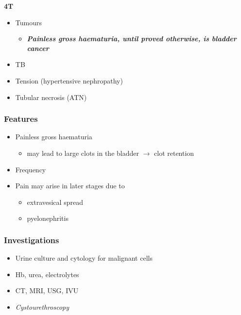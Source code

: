 \documentclass[
  14pt,
]{extarticle}
\providecommand{\tightlist}{%
  \setlength{\itemsep}{0pt}\setlength{\parskip}{0pt}}
\begin{document}
\textbf{4T}

\begin{itemize}
\tightlist
\item
  Tumours

  \begin{itemize}
  \tightlist
  \item
    \emph{\textbf{Painless gross haematuria, until proved otherwise, is
    bladder cancer}}
  \end{itemize}
\item
  TB
\item
  Tension (hypertensive nephropathy)
\item
  Tubular necrosis (ATN)
\end{itemize}

\hypertarget{features-6}{%
\subsubsection{Features}\label{features-6}}

\begin{itemize}
\tightlist
\item
  Painless gross haematuria

  \begin{itemize}
  \tightlist
  \item
    may lead to large clots in the bladder \(\rightarrow\) clot
    retention
  \end{itemize}
\item
  Frequency
\item
  Pain may arise in later stages due to

  \begin{itemize}
  \tightlist
  \item
    extravesical spread
  \item
    pyelonephritis
  \end{itemize}
\end{itemize}

\hypertarget{investigations-5}{%
\subsubsection{Investigations}\label{investigations-5}}

\begin{itemize}
\tightlist
\item
  Urine culture and cytology for malignant cells
\item
  Hb, urea, electrolytes
\item
  CT, MRI, USG, IVU
\item
  \emph{Cystourethroscopy}
\end{itemize}
\end{document}
